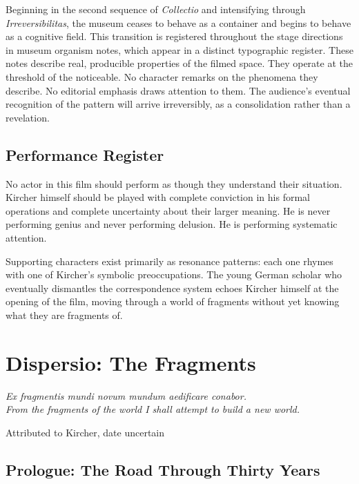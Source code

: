 \documentclass[12pt, a4paper, twoside]{memoir}
\theoremstyle{definition}
\theoremstyle{remark}
\begin{document}
Beginning in the second sequence of \textit{Collectio} and intensifying through \textit{Irreversibilitas}, the museum ceases to behave as a container and begins to behave as a cognitive field. This transition is registered throughout the stage directions in museum organism notes, which appear in a distinct typographic register. These notes describe real, producible properties of the filmed space. They operate at the threshold of the noticeable. No character remarks on the phenomena they describe. No editorial emphasis draws attention to them. The audience's eventual recognition of the pattern will arrive irreversibly, as a consolidation rather than a revelation.

\section*{Performance Register}

No actor in this film should perform as though they understand their situation. Kircher himself should be played with complete conviction in his formal operations and complete uncertainty about their larger meaning. He is never performing genius and never performing delusion. He is performing systematic attention.

Supporting characters exist primarily as resonance patterns: each one rhymes with one of Kircher's symbolic preoccupations. The young German scholar who eventually dismantles the correspondence system echoes Kircher himself at the opening of the film, moving through a world of fragments without yet knowing what they are fragments of.

\clearpage

\chapter{Dispersio: The Fragments}

\epigraph{\itshape Ex fragmentis mundi novum mundum aedificare conabor.\\
From the fragments of the world I shall attempt to build a new world.}{Attributed to Kircher, date uncertain}

\section{Prologue: The Road Through Thirty Years}
\end{document}
